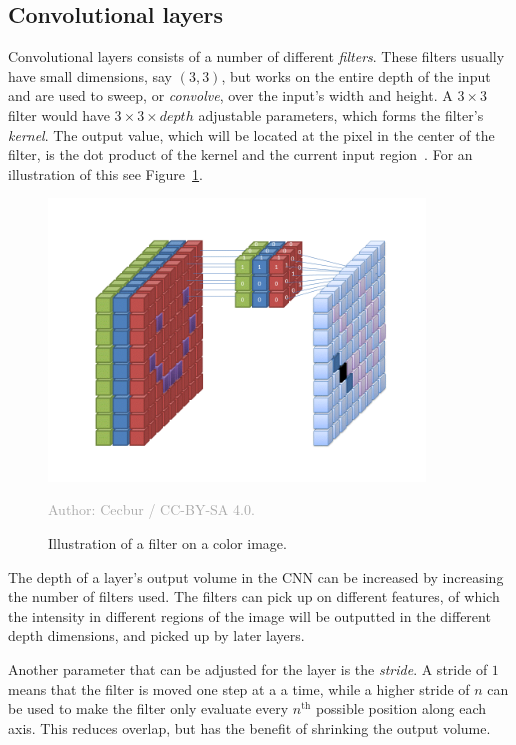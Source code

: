 \documentclass{kththesis}
\newcommand{\source}[1]{\vspace{-5mm}\caption*{\textcolor{darkgray}{Author: {#1}}\vspace{-7mm}} }
\begin{document}
\subsection{Convolutional layers}
Convolutional layers consists of a number of different \textit{filters}. These filters usually have small dimensions, say $(3, 3)$, but works on the entire depth of the input and are used to sweep, or \textit{convolve}, over the input's width and height. A $3 \times 3$ filter would have $3 \times 3 \times depth$ adjustable parameters, which forms the filter's \textit{kernel}. The output value, which will be located at the pixel in the center of the filter, is the dot product of the kernel and the current input region~\cite{cnnIntro}. For an illustration of this see Figure~\ref{fig:cnn_color_filter}.

\begin{figure}
  \begin{center}
    \includegraphics[width=100mm]{img/cnn_color_filter.png}
    \caption{Illustration of a filter on a color image.}
    \source{Cecbur / CC-BY-SA 4.0.}
    \label{fig:cnn_color_filter}
  \end{center}
\end{figure}

The depth of a layer's output volume in the CNN can be increased by increasing the number of filters used. The filters can pick up on different features, of which the intensity in different regions of the image will be outputted in the different depth dimensions, and picked up by later layers.

Another parameter that can be adjusted for the layer is the \textit{stride}. A stride of $1$ means that the filter is moved one step at a a time, while a higher stride of $n$ can be used to make the filter only evaluate every $n^{\text{th}}$ possible position along each axis. This reduces overlap, but has the benefit of shrinking the output volume.
\end{document}
